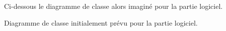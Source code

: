 Ci-dessous le diagramme de classe alors imaginé pour la partie logiciel.

\begin{center}
  
  Diagramme de classe initialement prévu pour la partie logiciel.
\end{center}
